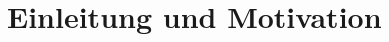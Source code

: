 \documentclass[../main.tex]{subfiles}
\begin{document}
\section{Einleitung und Motivation}
\end{document}

